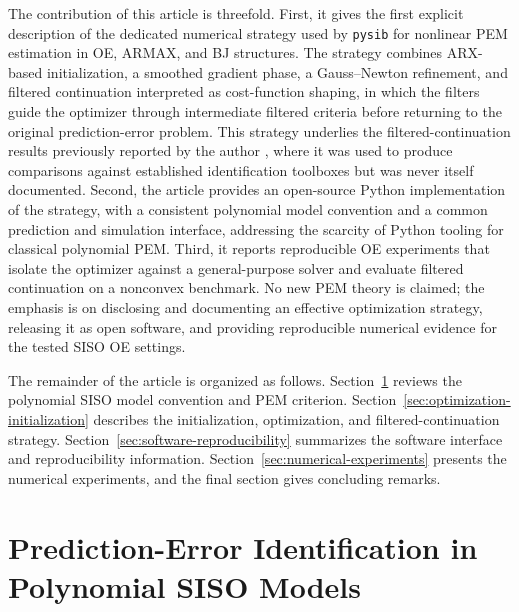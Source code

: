 \documentclass{ifacconf}
\begin{document}
The contribution of this article is threefold.  First, it gives the first
explicit description of the dedicated numerical strategy used by \texttt{pysib}
for nonlinear PEM estimation in OE, ARMAX, and BJ structures.  The strategy
combines ARX-based initialization, a smoothed gradient phase, a Gauss--Newton
refinement, and filtered continuation interpreted as cost-function shaping, in
which the filters guide the optimizer through intermediate filtered criteria
before returning to the original prediction-error problem.  This strategy
underlies the filtered-continuation results previously reported by the author
\citep{eckhard2013input,eckhard2017cost}, where it was used to produce
comparisons against established identification toolboxes but was never itself
documented.  Second, the article provides an open-source Python implementation
of the strategy, with a consistent polynomial model convention and a common
prediction and simulation interface, addressing the scarcity of Python tooling
for classical polynomial PEM.  Third, it reports reproducible OE experiments that
isolate the optimizer against a general-purpose solver and evaluate filtered
continuation on a nonconvex benchmark.  No new PEM theory is claimed; the
emphasis is on disclosing and documenting an effective optimization strategy,
releasing it as open software, and providing reproducible numerical evidence for
the tested SISO OE settings.

The remainder of the article is organized as follows.  Section~\ref{sec:polynomial-siso-models}
reviews the polynomial SISO model convention and PEM criterion.
Section~\ref{sec:optimization-initialization} describes the initialization,
optimization, and filtered-continuation strategy.  Section~\ref{sec:software-reproducibility}
summarizes the software interface and reproducibility information.
Section~\ref{sec:numerical-experiments} presents the numerical experiments, and
the final section gives concluding remarks.

\section{Prediction-Error Identification in Polynomial SISO Models}
\label{sec:polynomial-siso-models}
\end{document}
